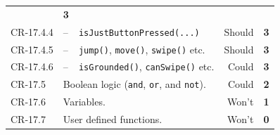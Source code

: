 \begin{center}
\begin{longtable}{lp{0.5cm}p{7cm}rc}
    & \textbf{3}
    \\
    CR-17.4.4
    & -- & \texttt{isJustButtonPressed(...)}
    & Should
    & \textbf{3}
    \\
    CR-17.4.5
    & -- & \texttt{jump()}, \texttt{move()}, \texttt{swipe()} etc.
    & Should
    & \textbf{3}
    \\
    CR-17.4.6
    & -- & \texttt{isGrounded()}, \texttt{canSwipe()} etc.
    & Could
    & \textbf{3}
    \\
    CR-17.5
    & \multicolumn{2}{l}{Boolean logic (\texttt{and}, \texttt{or}, and \texttt{not}).}
    & Could
    & \textbf{2}
    \\
    CR-17.6
    & \multicolumn{2}{l}{Variables.}
    & Won't
    & \textbf{1}
    \\
    CR-17.7
    & \multicolumn{2}{l}{User defined functions.}
    & Won't
    & \textbf{0}
    \\
    \bottomrule
  \end{longtable}
\end{center}